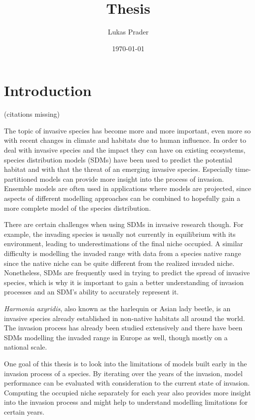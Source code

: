 \documentclass[12pt,a4paper]{article}
\begin{document}
\title{Thesis}
\author{Lukas Prader}
\date{\today}
\maketitle

\newpage
\tableofcontents
\newpage

\section{Introduction}
(citations missing)

The topic of invasive species has become more and more important, even more so with recent changes in climate and habitats due to human influence.
In order to deal with invasive species and the impact they can have on existing ecosystems, species distribution models (SDMs) have been used to predict the potential habitat and with that the threat of an emerging invasive species.
Especially time-partitioned models can provide more insight into the process of invasion. 
Ensemble models are often used in applications where models are projected, since aspects of different modelling approaches can be combined to hopefully gain a more complete model of the species distribution. 

There are certain challenges when using SDMs in invasive research though. 
For example, the invading species is usually not currently in equilibrium with its environment, leading to underestimations of the final niche occupied. 
A similar difficulty is modelling the invaded range with data from a species native range since the native niche can be quite different from the realized invaded niche.
Nonetheless, SDMs are frequently used in trying to predict the spread of invasive species, which is why it is important to gain a better understanding of invasion processes and an SDM's ability to accurately represent it.

\textit{Harmonia axyridis}, also known as the harlequin or Asian lady beetle, is an invasive species already established in non-native habitats all around the world.
The invasion process has already been studied extensively and there have been SDMs modelling the invaded range in Europe as well, though mostly on a national scale. 

One goal of this thesis is to look into the limitations of models built early in the invasion process of a species. 
By iterating over the years of the invasion, model performance can be evaluated with consideration to the current state of invasion.
Computing the occupied niche separately for each year also provides more insight into the invasion process and might help to understand modelling limitations for certain years.
\end{document}
